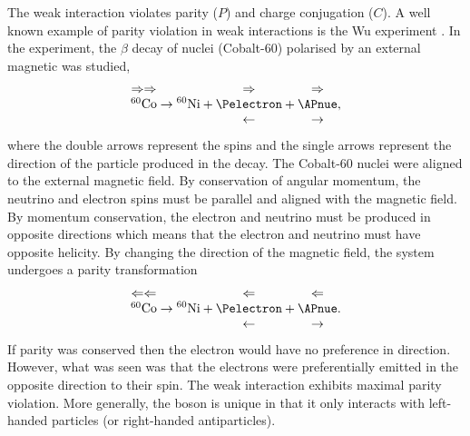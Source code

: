 The weak interaction violates parity ($P$) and charge conjugation ($C$). A
well known example of parity violation in weak interactions is the Wu experiment
\cite{wu1957experimental}.
In the experiment, the $\beta$ decay of nuclei (Cobalt-60) polarised by an
external magnetic was studied, 
\begin{equation}
\begin{matrix}
\Rightarrow\Rightarrow \\
^{60}\mathrm{Co} \\
~   
\end{matrix}
\to
{^{60}\mathrm{Ni}}
+
\begin{matrix}
\Rightarrow \\
\Pelectron \\
\leftarrow 
\end{matrix}
+
\begin{matrix}
\Rightarrow \\
\APnue \\
\rightarrow 
\end{matrix},
\end{equation}
where the double arrows represent the spins and the single arrows represent the
direction of the particle produced in the decay.
The Cobalt-60 nuclei were aligned to the external magnetic field. By
conservation of angular momentum, the neutrino and electron spins must be
parallel and aligned with the magnetic field. By momentum conservation, the
electron and neutrino must be produced in opposite directions which means that
the electron and neutrino must have opposite helicity.  By changing the direction
of the magnetic field, the system undergoes a parity transformation
\begin{equation}
\begin{matrix}
\Leftarrow\Leftarrow \\
^{60}\mathrm{Co} \\
~   
\end{matrix}
\to
{^{60}\mathrm{Ni}}
+
\begin{matrix}
\Leftarrow \\
\Pelectron \\
\leftarrow 
\end{matrix}
+
\begin{matrix}
\Leftarrow \\
\APnue \\
\rightarrow 
\end{matrix}.
\end{equation}
If parity was conserved then the electron would have no preference in direction.
However, what was seen was that the electrons were preferentially emitted in the
opposite direction to their spin. The weak interaction exhibits maximal parity
violation.
More generally, the \PWpm boson is unique in that it only interacts with left-handed
particles (or right-handed antiparticles).

